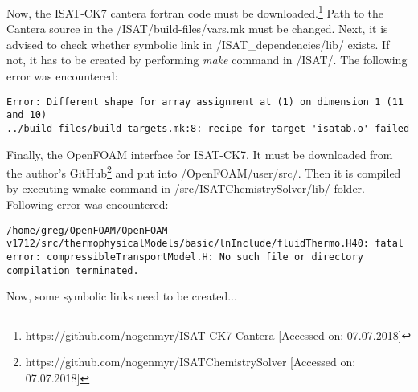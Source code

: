 \documentclass[12pt,english]{article}
\begin{document}
Now, the ISAT-CK7 cantera fortran code must be downloaded.\footnote{https://github.com/nogenmyr/ISAT-CK7-Cantera [Accessed on: 07.07.2018]} Path to the Cantera source in the /ISAT/build-files/vars.mk must be changed. Next, it is advised to check whether symbolic link in /ISAT_dependencies/lib/ exists. If not, it has to be created by performing \textit{make} command in /ISAT/. The following error was encountered:
\begin{lstlisting}
Error: Different shape for array assignment at (1) on dimension 1 (11 and 10)
../build-files/build-targets.mk:8: recipe for target 'isatab.o' failed
\end{lstlisting}


Finally, the OpenFOAM interface for ISAT-CK7. It must be downloaded from the author's GitHub\footnote{https://github.com/nogenmyr/ISATChemistrySolver [Accessed on: 07.07.2018]} and put into /OpenFOAM/user/src/. Then it is compiled by executing wmake command in /src/ISATChemistrySolver/lib/ folder. Following error was encountered:
\begin{lstlisting}
/home/greg/OpenFOAM/OpenFOAM-v1712/src/thermophysicalModels/basic/lnInclude/fluidThermo.H40: fatal error: compressibleTransportModel.H: No such file or directory
compilation terminated.
\end{lstlisting}
Now, some symbolic links need to be created...
\end{document}

